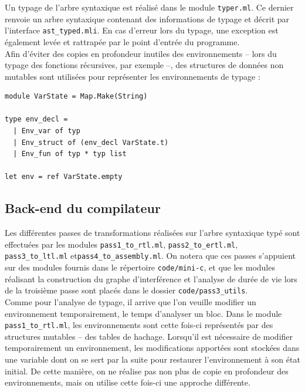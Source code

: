 \documentclass[paper=a4, fontsize=11pt]{scrartcl}
\numberwithin{figure}{section}			%
\numberwithin{table}{section}				%
\begin{document}
Un typage de l'arbre syntaxique est réalisé dans le module \texttt{typer.ml}. Ce dernier renvoie un arbre syntaxique contenant des informations de typage et décrit par l'interface \texttt{ast\_typed.mli}. En cas d'erreur lors du typage, une exception est également levée et rattrapée par le point d'entrée du programme.\\

Afin d'éviter des copies en profondeur inutiles des environnements -- lors du typage des fonctions récursives, par exemple --, des structures de données non mutables sont utilisées pour représenter les environnements de typage :

\begin{verbatim}
module VarState = Map.Make(String)

type env_decl =
  | Env_var of typ
  | Env_struct of (env_decl VarState.t)
  | Env_fun of typ * typ list

let env = ref VarState.empty
\end{verbatim}

\subsection{Back-end du compilateur}

Les différentes passes de transformations réalisées sur l'arbre syntaxique typé sont effectuées par les modules \texttt{pass1\_to\_rtl.ml}, \texttt{pass2\_to\_ertl.ml}, \texttt{pass3\_to\_ltl.ml} et\newline \texttt{pass4\_to\_assembly.ml}. On notera que ces passes s'appuient sur des modules fournis dans le répertoire \texttt{code/mini-c}, et que les modules réalisant la construction du graphe d'interférence et l'analyse de durée de vie lors de la troisième passe sont placés dans le dossier \texttt{code/pass3\_utils}.\\

Comme pour l'analyse de typage, il arrive que l'on veuille modifier un environnement temporairement, le temps d'analyser un bloc. Dans le module \texttt{pass1\_to\_rtl.ml}, les environnements sont cette fois-ci représentés par des structures mutables -- des tables de hachage. Lorsqu'il est nécessaire de modifier temporairement un environnement, les modifications apportées sont stockées dans une variable dont on se sert par la suite pour restaurer l'environnement à son état initial. De cette manière, on ne réalise pas non plus de copie en profondeur des environnements, mais on utilise cette fois-ci une approche différente.
\end{document}
